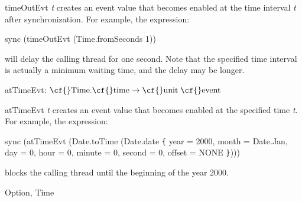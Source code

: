 \begin{descr}
\begin{speccomment}
\item {\cf \small time\-Out\-Evt \mbox{\cf \small \textit{t}}           } 
creates an event value that becomes enabled at the time 	  interval \mbox{\cf \small \textit{t}} after synchronization. 	  For example, the expression: 	  
\begin{code}
	    sync (time\-Out\-Evt (Time.fromSeconds 1))
	  
\end{code}
 	  will delay the calling thread for one second. 	  Note that the specified time interval is actually a minimum 	  waiting time, and the delay may be longer.     \end{speccomment}
\item {}{} {\cf atTimeEvt: \(\mbox{\cf{}Time}.\mbox{\cf{}time}\rightarrow \mbox{\cf{}unit}\;\mbox{\cf{}event}\)}\label{val-CML.atTimeEvt}


\begin{speccomment}
\item {\cf \small at\-Time\-Evt \mbox{\cf \small \textit{t}}           } 
creates an event value that becomes enabled at the specified time 	  \mbox{\cf \small \textit{t}}. 	  For example, the expression: 	  
\begin{code}
	    sync (at\-Time\-Evt (Date.toTime (Date.date {\tt\{}
		year = 2000, month = Date.Jan, day = 0,
		hour = 0, minute = 0, second = 0, 
		offset = NONE
	      {\tt\}})))
	  
\end{code}
 	  blocks the calling thread until the beginning of the year 2000.     \end{speccomment}
\end{descr}

\begin{seealso}
{\cf Option}, {\cf Time}
\end{seealso}
